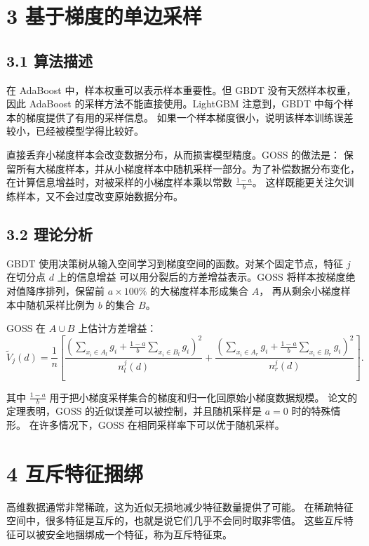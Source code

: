\section{3 基于梯度的单边采样}

\subsection{3.1 算法描述}

在 AdaBoost 中，样本权重可以表示样本重要性。但 GBDT 没有天然样本权重，
因此 AdaBoost 的采样方法不能直接使用。LightGBM 注意到，GBDT 中每个样本的梯度提供了有用的采样信息。
如果一个样本梯度很小，说明该样本训练误差较小，已经被模型学得比较好。

直接丢弃小梯度样本会改变数据分布，从而损害模型精度。GOSS 的做法是：
保留所有大梯度样本，并从小梯度样本中随机采样一部分。为了补偿数据分布变化，
在计算信息增益时，对被采样的小梯度样本乘以常数 $\frac{1-a}{b}$。
这样既能更关注欠训练样本，又不会过度改变原始数据分布。

\subsection{3.2 理论分析}

GBDT 使用决策树从输入空间学习到梯度空间的函数。对某个固定节点，特征 $j$ 在切分点 $d$ 上的信息增益
可以用分裂后的方差增益表示。GOSS 将样本按梯度绝对值降序排列，保留前 $a\times 100\%$ 的大梯度样本形成集合 $A$，
再从剩余小梯度样本中随机采样比例为 $b$ 的集合 $B$。

GOSS 在 $A\cup B$ 上估计方差增益：
\[
  \tilde{V}_j(d)
  =
  \frac{1}{n}
  \left[
    \frac{
      \left(
        \sum_{x_i\in A_l}g_i
        +
        \frac{1-a}{b}\sum_{x_i\in B_l}g_i
      \right)^2
    }{n_l^j(d)}
    +
    \frac{
      \left(
        \sum_{x_i\in A_r}g_i
        +
        \frac{1-a}{b}\sum_{x_i\in B_r}g_i
      \right)^2
    }{n_r^j(d)}
  \right].
\]

其中 $\frac{1-a}{b}$ 用于把小梯度采样集合的梯度和归一化回原始小梯度数据规模。
论文的定理表明，GOSS 的近似误差可以被控制，并且随机采样是 $a=0$ 时的特殊情形。
在许多情况下，GOSS 在相同采样率下可以优于随机采样。

\section{4 互斥特征捆绑}

高维数据通常非常稀疏，这为近似无损地减少特征数量提供了可能。
在稀疏特征空间中，很多特征是互斥的，也就是说它们几乎不会同时取非零值。
这些互斥特征可以被安全地捆绑成一个特征，称为互斥特征束。

